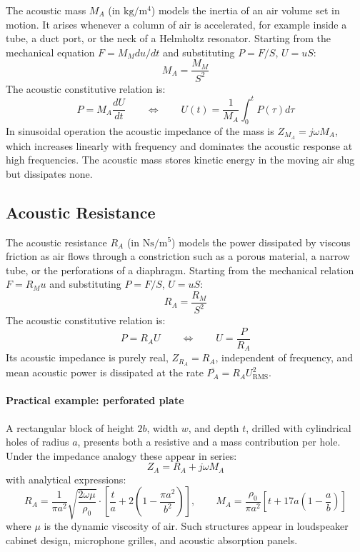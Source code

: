 The acoustic mass \(M_A\) (in \(\si{\kilo\gram\per\meter\tothe{4}}\)) models the inertia of an air volume set in motion. It arises whenever a column of air is accelerated, for example inside a tube, a duct port, or the neck of a Helmholtz resonator. Starting from the mechanical equation \(F = M_M du/dt\) and substituting \(P = F/S\), \(U = uS\):
\[
M_A = \frac{M_M}{S^2}
\]
The acoustic constitutive relation is:
\[
P = M_A \frac{dU}{dt}
\qquad\Leftrightarrow\qquad
U(t) = \frac{1}{M_A}\int_0^t P(\tau) d\tau
\]
In sinusoidal operation the acoustic impedance of the mass is \(Z_{M_A} = j\omega M_A\), which increases linearly with frequency and dominates the acoustic response at high frequencies. The acoustic mass stores kinetic energy in the moving air slug but dissipates none.

\subsection{Acoustic Resistance}
\label{ssc:312}

The acoustic resistance \(R_A\) (in \(\si{\newton\second\per\meter\tothe{5}}\)) models the power dissipated by viscous friction as air flows through a constriction such as a porous material, a narrow tube, or the perforations of a diaphragm. Starting from the mechanical relation \(F = R_M u\) and substituting \(P = F/S\), \(U = uS\):
\[
R_A = \frac{R_M}{S^2}
\]
The acoustic constitutive relation is:
\[
P = R_A U
\qquad\Leftrightarrow\qquad
U = \frac{P}{R_A}
\]
Its acoustic impedance is purely real, \(Z_{R_A} = R_A\), independent of frequency, and mean acoustic power is dissipated at the rate \(\overline{P_A} = R_A U_{\mathrm{RMS}}^2\).

\paragraph{Practical example: perforated plate}
A rectangular block of height \(2b\), width \(w\), and depth \(t\), drilled with cylindrical holes of radius \(a\), presents both a resistive and a mass
contribution per hole. Under the impedance analogy these appear in series: \[
Z_A = R_A + j\omega M_A
\]
with analytical expressions:
\[
R_A = \frac{1}{\pi a^2}\sqrt{\frac{2\omega\mu}{\rho_0}}
\cdot\left[\frac{t}{a} + 2\!\left(1 - \frac{\pi a^2}{b^2}\right)\right],
\qquad
M_A = \frac{\rho_0}{\pi a^2}\left[t + 17a\!\left(1 - \frac{a}{b}\right)\right]
\]
where \(\mu\) is the dynamic viscosity of air. Such structures appear in loudspeaker cabinet design, microphone grilles, and acoustic absorption panels.

